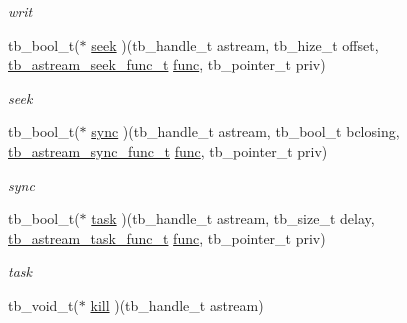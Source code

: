 \begin{DoxyCompactItemize}
{{{\begin{DoxyCompactList}\small\item\em writ \end{DoxyCompactList}\item 
\hypertarget{structtb__astream__t_a53f2e96e637828c0235bf028ce7032e0}{tb\-\_\-bool\-\_\-t($\ast$ \hyperlink{structtb__astream__t_a53f2e96e637828c0235bf028ce7032e0}{seek} )(tb\-\_\-handle\-\_\-t astream, tb\-\_\-hize\-\_\-t offset, \hyperlink{astream_8h_a2c68bce4ed336abc6759878c0d083c5d}{tb\-\_\-astream\-\_\-seek\-\_\-func\-\_\-t} \hyperlink{structtb__astream__t_a758a20865d0e9bf0c6b0ee1613d7f9cb}{func}, tb\-\_\-pointer\-\_\-t priv)}\label{structtb__astream__t_a53f2e96e637828c0235bf028ce7032e0}

\begin{DoxyCompactList}\small\item\em seek \end{DoxyCompactList}\item 
\hypertarget{structtb__astream__t_a798f14e5debda4ba6906675fb20cb281}{tb\-\_\-bool\-\_\-t($\ast$ \hyperlink{structtb__astream__t_a798f14e5debda4ba6906675fb20cb281}{sync} )(tb\-\_\-handle\-\_\-t astream, tb\-\_\-bool\-\_\-t bclosing, \hyperlink{astream_8h_a972a0ad008bf72f7219dce843f194e86}{tb\-\_\-astream\-\_\-sync\-\_\-func\-\_\-t} \hyperlink{structtb__astream__t_a758a20865d0e9bf0c6b0ee1613d7f9cb}{func}, tb\-\_\-pointer\-\_\-t priv)}\label{structtb__astream__t_a798f14e5debda4ba6906675fb20cb281}

\begin{DoxyCompactList}\small\item\em sync \end{DoxyCompactList}\item 
\hypertarget{structtb__astream__t_a97772eef417a9bf505fce98c29a29ed1}{tb\-\_\-bool\-\_\-t($\ast$ \hyperlink{structtb__astream__t_a97772eef417a9bf505fce98c29a29ed1}{task} )(tb\-\_\-handle\-\_\-t astream, tb\-\_\-size\-\_\-t delay, \hyperlink{astream_8h_aba49851c45c8a0e2bac1e01dabae65f3}{tb\-\_\-astream\-\_\-task\-\_\-func\-\_\-t} \hyperlink{structtb__astream__t_a758a20865d0e9bf0c6b0ee1613d7f9cb}{func}, tb\-\_\-pointer\-\_\-t priv)}\label{structtb__astream__t_a97772eef417a9bf505fce98c29a29ed1}

\begin{DoxyCompactList}\small\item\em task \end{DoxyCompactList}\item 
\hypertarget{structtb__astream__t_a2f8a3167bc46e6b7df8e2ab1c5bf4e8a}{tb\-\_\-void\-\_\-t($\ast$ \hyperlink{structtb__astream__t_a2f8a3167bc46e6b7df8e2ab1c5bf4e8a}{kill} )(tb\-\_\-handle\-\_\-t astream)}\label{structtb__astream__t_a2f8a3167bc46e6b7df8e2ab1c5bf4e8a}

}}}
\end{DoxyCompactItemize}

